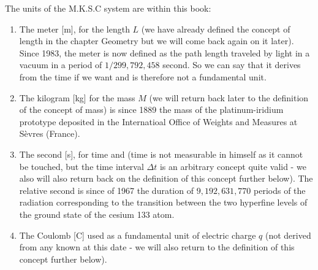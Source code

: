 	The units of the M.K.S.C system are within this book:
	\begin{enumerate}
		\item The meter [m], for the length $L$ (we have already defined the concept of length in the chapter Geometry but we will come back again on it later). Since 1983, the meter is now defined as the path length traveled by light in a vacuum in a period of $1 / 299,792,458$ second. So we can say that it derives from the time if we want and is therefore not a fundamental unit.

		\item The kilogram [kg] for the mass $M$ (we will return back later to the definition of the concept of mass) is since 1889 the mass of the platinum-iridium prototype deposited in the Internatioal Office of Weights and Measures at Sèvres (France).
		
		\item The second [s], for time and (time is not measurable in himself as it cannot be touched, but the time interval $\Delta t$ is an arbitrary concept quite valid - we also will also return back on the definition of this concept further below). The relative second is since of 1967 the duration of $9,192,631,770$ periods of the radiation corresponding to the transition between the two hyperfine levels of the ground state of the cesium 133 atom.

		\item The Coulomb [C] used as a fundamental unit of electric charge $q$ (not derived from any known at this date - we will also return to the definition of this concept further below).
	\end{enumerate}
	
